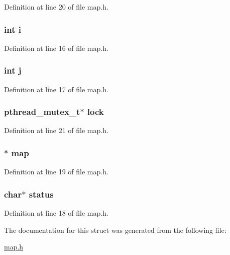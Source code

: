 Definition at line 20 of file map.\-h.

\hypertarget{structthread__data_acb559820d9ca11295b4500f179ef6392}{
\subsubsection[{i}]{\setlength{\rightskip}{0pt plus 5cm}int i}}\label{structthread__data_acb559820d9ca11295b4500f179ef6392}


Definition at line 16 of file map.\-h.

\hypertarget{structthread__data_a37d972ae0b47b9099e30983131d31916}{
\subsubsection[{j}]{\setlength{\rightskip}{0pt plus 5cm}int j}}\label{structthread__data_a37d972ae0b47b9099e30983131d31916}


Definition at line 17 of file map.\-h.

\hypertarget{structthread__data_a33586b4184d23f2b8f4df153ec23af13}{
\subsubsection[{lock}]{\setlength{\rightskip}{0pt plus 5cm}pthread\-\_\-mutex\-\_\-t$\ast$ lock}}\label{structthread__data_a33586b4184d23f2b8f4df153ec23af13}


Definition at line 21 of file map.\-h.

\hypertarget{structthread__data_af2bb9dc718068dc88b8250185d0d6ab7}{
\subsubsection[{map}]{$\ast$ map}}\label{structthread__data_af2bb9dc718068dc88b8250185d0d6ab7}


Definition at line 19 of file map.\-h.

\hypertarget{structthread__data_a3cbe9fdcd03667b9bc176454129f4d52}{
\subsubsection[{status}]{\setlength{\rightskip}{0pt plus 5cm}char$\ast$ status}}\label{structthread__data_a3cbe9fdcd03667b9bc176454129f4d52}


Definition at line 18 of file map.\-h.



The documentation for this struct was generated from the following file\-:\begin{DoxyCompactItemize}
\item 
\hyperlink{map_8h}{map.\-h}\end{DoxyCompactItemize}
